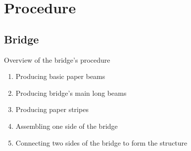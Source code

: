 \section{Procedure}
\subsection{Bridge}
Overview of the bridge’s procedure
\begin{enumerate}
\item Producing basic paper beams 
\item Producing bridge’s main long beams
\item Producing paper stripes
\item Assembling one side of the bridge
\item Connecting two sides of the bridge to form the structure
\end{enumerate}

